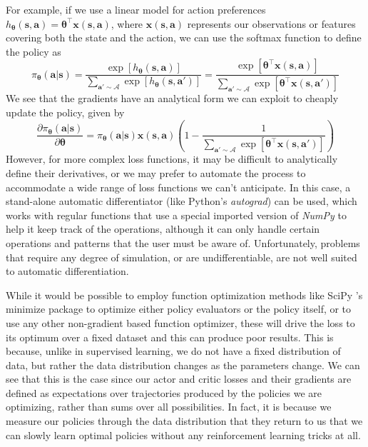 \documentclass{article}
\begin{document}
For example, if we use a linear model for action preferences $h_{\boldsymbol{\theta}}(\mathbf{s},\mathbf{a})=\boldsymbol{\theta}^\top\mathbf{x}(\mathbf{s},\mathbf{a})$, where $\mathbf{x}(\mathbf{s},\mathbf{a})$ represents our observations or features covering both the state and the action, we can use the softmax function to define the policy as \begin{equation}\pi_{\boldsymbol{\theta}}(\mathbf{a}|\mathbf{s})=\frac{\exp[h_{\boldsymbol{\theta}}(\mathbf{s},\mathbf{a})]}{\sum_{\mathbf{a}'\sim\mathcal{A}}\exp[h_{\boldsymbol{\theta}}(\mathbf{s},\mathbf{a}')]}=\frac{\exp[\boldsymbol{\theta}^\top\mathbf{x}(\mathbf{s},\mathbf{a})]}{\sum_{\mathbf{a}'\sim\mathcal{A}}\exp[\boldsymbol{\theta}^\top\mathbf{x}(\mathbf{s},\mathbf{a}')]}\end{equation}We see that the gradients have an analytical form we can exploit to cheaply update the policy, given by \begin{equation}\frac{\partial \pi_{\boldsymbol{\theta}}(\mathbf{a}|\mathbf{s})}{\partial \boldsymbol{\theta}}=\pi_{\boldsymbol{\theta}}(\mathbf{a}|\mathbf{s})\mathbf{x}(\mathbf{s},\mathbf{a})\left(1-\frac{1}{\sum_{\mathbf{a}'\sim\mathcal{A}}\exp[\boldsymbol{\theta}^\top\mathbf{x}(\mathbf{s},\mathbf{a}')]}\right)\end{equation}
However, for more complex loss functions, it may be difficult to analytically define their derivatives, or we may prefer to automate the process to accommodate a wide range of loss functions we can't anticipate. In this case, a stand-alone automatic differentiator (like Python's \textit{autograd}) can be used, which works with regular functions that use a special imported version of \textit{NumPy} to help it keep track of the operations, although it can only handle certain operations and patterns that the user must be aware of. Unfortunately, problems that require any degree of simulation, or are undifferentiable, are not well suited to automatic differentiation.

While it would be possible to employ function optimization methods like SciPy 's minimize package to optimize either policy evaluators or the policy itself, or to use any other non-gradient based function optimizer, these will drive the loss to its optimum over a fixed dataset and this can produce poor results. This is because, unlike in supervised learning, we do not have a fixed distribution of data, but rather the data distribution changes as the parameters change. We can see that this is the case since our actor and critic losses and their gradients are defined as expectations over trajectories produced by the policies we are optimizing, rather than sums over all possibilities. In fact, it is because we measure our policies through the data distribution that they return to us that we can slowly learn optimal policies without any reinforcement learning tricks at all. 
\end{document}
